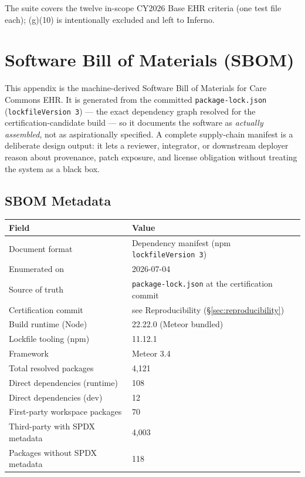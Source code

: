 The suite covers the twelve in-scope CY2026 Base EHR criteria (one test file each); (g)(10) is intentionally excluded and left to Inferno.

\chapter{Software Bill of Materials (SBOM)}
\label{chap:sbom}

This appendix is the machine-derived Software Bill of Materials for Care
Commons EHR. It is generated from the committed
\texttt{package-lock.json} (\texttt{lockfileVersion~3}) --- the exact
dependency graph resolved for the certification-candidate build --- so it documents the
software as \emph{actually assembled}, not as aspirationally specified. A
complete supply-chain manifest is a deliberate design output: it lets a
reviewer, integrator, or downstream deployer reason about provenance, patch
exposure, and license obligation without treating the system as a black box.

\section{SBOM Metadata}

\begin{center}
\begin{tabular}{@{}ll@{}}
\toprule
\textbf{Field} & \textbf{Value} \\
\midrule
Document format & Dependency manifest (npm \texttt{lockfileVersion 3}) \\
Enumerated on & 2026-07-04 \\
Source of truth & \texttt{package-lock.json} at the certification commit \\
Certification commit & see Reproducibility (\S\ref{sec:reproducibility}) \\
Build runtime (Node) & 22.22.0 (Meteor bundled) \\
Lockfile tooling (npm) & 11.12.1 \\
Framework & Meteor 3.4 \\
Total resolved packages & 4{,}121 \\
Direct dependencies (runtime) & 108 \\
Direct dependencies (dev) & 12 \\
First-party workspace packages & 70 \\
Third-party with SPDX metadata & 4{,}003 \\
Packages without SPDX metadata & 118 \\
\bottomrule
\end{tabular}
\end{center}

